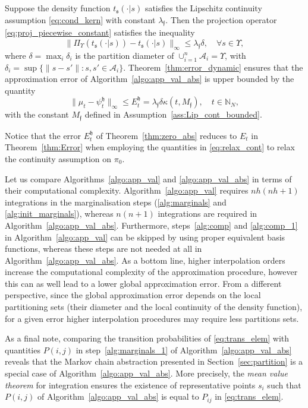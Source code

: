 \documentclass{LMCS}
\begin{document}
\begin{thm}
\label{thm:zero_abs} 
Suppose the density function $t_{\mathfrak s}(\cdot|s)$ satisfies the Lipschitz continuity assumption \eqref{eq:cond_kern} with constant $\lambda_{\mathfrak f}$. Then the projection operator \eqref{eq:proj_piecewise_constant} satisfies the inequality 
\begin{equation*}
\|\Pi_{\Upsilon}\left(t_{\mathfrak s}(\cdot|s)\right)-t_{\mathfrak s}(\cdot|s)\|_{\infty} \le \lambda_{\mathfrak f}\delta, \quad \forall s\in\Upsilon,
\end{equation*}
where $\delta = \max_i \delta_i$ is the partition diameter of $\cup_{i=1}^{n}\mathcal A_i = \Upsilon$,
with $\delta_i =\sup\{\|s-s'\|: s,s'\in\mathcal A_i\}$.
Theorem~\ref{thm:error_dynamic} ensures that the approximation error of Algorithm~\ref{algo:app_val_abs} is upper bounded by the quantity
\begin{equation*}
\|\mu_t-\psi_t^{\mathfrak h}\|_\infty\le E_t^{\mathfrak h} = \lambda_{\mathfrak f}\delta\kappa(t,M_{\mathfrak f}), \quad t\in\mathbb N_N,
\end{equation*}
with the constant $M_{\mathfrak f}$ defined in Assumption~\ref{ass:Lip_cont_bounded}. 
\end{thm}
Notice that the error $E_t^{\mathfrak h}$ of Theorem~\ref{thm:zero_abs} reduces to $E_t$ in Theorem~\ref{thm:Error} when employing the quantities in \eqref{eq:relax_cont} to relax the continuity assumption on $\pi_0$. 

Let us compare Algorithms~\ref{algo:app_val} and \ref{algo:app_val_abs} in terms of their computational complexity. 
Algorithm~\ref{algo:app_val} requires $nh(nh+1)$ integrations in the marginalisation steps (\ref{alg:marginals} and \ref{alg:init_marginals}),
whereas $n(n+1)$ integrations are required in Algorithm~\ref{algo:app_val_abs}.  
Furthermore, steps~\ref{alg:comp} and \ref{alg:comp_1} in Algorithm~\ref{algo:app_val} can be skipped by using proper equivalent basis functions, 
whereas these steps are not needed at all in Algorithm~\ref{algo:app_val_abs}. 
As a bottom line, 
higher interpolation orders increase the computational complexity of the approximation procedure, 
however this can as well lead to a lower global approximation error.   
From a different perspective, since the global approximation error depends on the local partitioning sets (their diameter and the local continuity of the density function), 
for a given error higher interpolation procedures may require less partitions sets.

As a final note, comparing the transition probabilities of \eqref{eq:trans_elem} with quantities $P(i,j)$ in step~\ref{alg:marginals_1} of Algorithm~\ref{algo:app_val_abs} reveals that the Markov chain abstraction presented in Section~\ref{sec:partition} is a special case of Algorithm~\ref{algo:app_val_abs}.
More precisely, the \emph{mean value theorem} for integration ensures the existence of representative points $s_i$ such that  $P(i,j)$ of Algorithm~\ref{algo:app_val_abs} is equal to $P_{ij}$ in \eqref{eq:trans_elem}.
\end{document}
